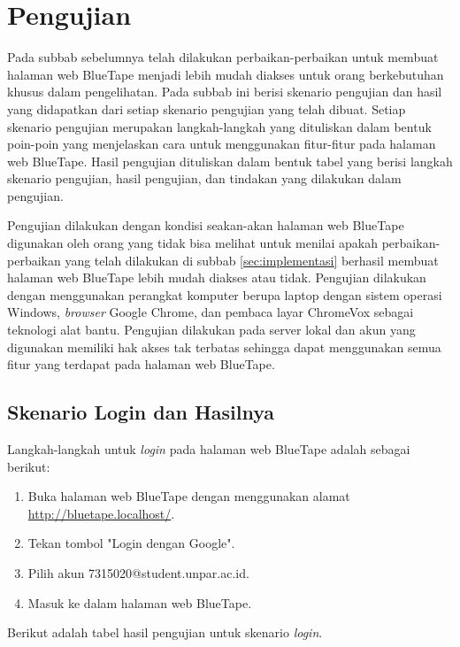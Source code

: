 \section{Pengujian}
\label{sec:pengujian}
Pada subbab sebelumnya telah dilakukan perbaikan-perbaikan untuk membuat halaman web BlueTape menjadi lebih mudah diakses untuk orang berkebutuhan khusus dalam pengelihatan. Pada subbab ini berisi skenario pengujian dan hasil yang didapatkan dari setiap skenario pengujian yang telah dibuat. Setiap skenario pengujian merupakan langkah-langkah yang dituliskan dalam bentuk poin-poin yang menjelaskan cara untuk menggunakan fitur-fitur pada halaman web BlueTape. Hasil pengujian dituliskan dalam bentuk tabel yang berisi langkah skenario pengujian, hasil pengujian, dan tindakan yang dilakukan dalam pengujian.

Pengujian dilakukan dengan kondisi seakan-akan halaman web BlueTape digunakan oleh orang yang tidak bisa melihat untuk menilai apakah perbaikan-perbaikan yang telah dilakukan di subbab \ref{sec:implementasi} berhasil membuat halaman web BlueTape lebih mudah diakses atau tidak. Pengujian dilakukan dengan menggunakan perangkat komputer berupa laptop dengan sistem operasi Windows, \textit{browser} Google Chrome, dan pembaca layar ChromeVox sebagai teknologi alat bantu. Pengujian dilakukan pada server lokal dan akun yang digunakan memiliki hak akses tak terbatas sehingga dapat menggunakan semua fitur yang terdapat pada halaman web BlueTape.

\subsection{Skenario Login dan Hasilnya}
\label{subsec:skenario_login}
Langkah-langkah untuk \textit{login} pada halaman web BlueTape adalah sebagai berikut:

\begin{enumerate}
    \item Buka halaman web BlueTape dengan menggunakan alamat \url{http://bluetape.localhost/}.
    \item Tekan tombol "Login dengan Google".
    \item Pilih akun 7315020@student.unpar.ac.id.
    \item Masuk ke dalam halaman web BlueTape.
\end{enumerate}

Berikut adalah tabel hasil pengujian untuk skenario \textit{login}.

